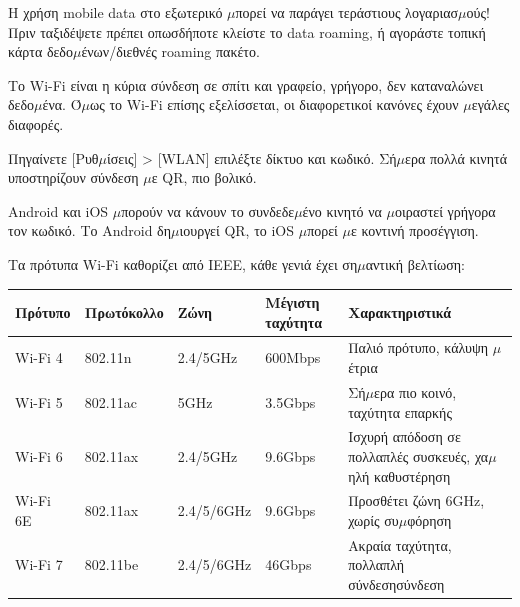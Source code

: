 Η χρήση mobile data στο εξωτερικό $\mu$πορεί να παράγει τεράστιους λογαριασ$\mu$ούς! Πριν ταξιδέψετε πρέπει οπωσδήποτε κλείστε το data roaming, ή αγοράστε τοπική κάρτα δεδο$\mu$ένων/διεθνές roaming πακέτο.


Το Wi-Fi είναι η κύρια σύνδεση σε σπίτι και γραφείο, γρήγορο, δεν καταναλώνει δεδο$\mu$ένα. Ό$\mu$ως το Wi-Fi επίσης εξελίσσεται, οι διαφορετικοί κανόνες έχουν $\mu$εγάλες διαφορές.


Πηγαίνετε [Ρυθ$\mu$ίσεις] > [WLAN] επιλέξτε δίκτυο και κωδικό. Σή$\mu$ερα πολλά κινητά υποστηρίζουν σύνδεση $\mu$ε QR, πιο βολικό.


Android και iOS $\mu$πορούν να κάνουν το συνδεδε$\mu$ένο κινητό να $\mu$οιραστεί γρήγορα τον κωδικό. Το Android δη$\mu$ιουργεί QR, το iOS $\mu$πορεί $\mu$ε κοντινή προσέγγιση.


Τα πρότυπα Wi-Fi καθορίζει από IEEE, κάθε γενιά έχει ση$\mu$αντική βελτίωση:

\begin{center}
\begin{tabularx}{\linewidth}{|X|X|X|X|X|}
\hline
\textbf{Πρότυπο} & \textbf{Πρωτόκολλο} & \textbf{Ζώνη} & \textbf{Μέγιστη ταχύτητα} & \textbf{Χαρακτηριστικά} \tabularnewline
\hline
Wi-Fi 4 & 802.11n & 2.4/5GHz & 600Mbps & Παλιό πρότυπο, κάλυψη $\mu$έτρια \tabularnewline
Wi-Fi 5 & 802.11ac & 5GHz & 3.5Gbps & Σή$\mu$ερα πιο κοινό, ταχύτητα επαρκής \tabularnewline
Wi-Fi 6 & 802.11ax & 2.4/5GHz & 9.6Gbps & Ισχυρή απόδοση σε πολλαπλές συσκευές, χα$\mu$ηλή καθυστέρηση \tabularnewline
Wi-Fi 6E & 802.11ax & 2.4/5/6GHz & 9.6Gbps & Προσθέτει ζώνη 6GHz, χωρίς συ$\mu$φόρηση \tabularnewline
Wi-Fi 7 & 802.11be & 2.4/5/6GHz & 46Gbps & Ακραία ταχύτητα, πολλαπλή σύνδεσησύνδεση \tabularnewline
\hline
\end{tabularx}
\end{center}

